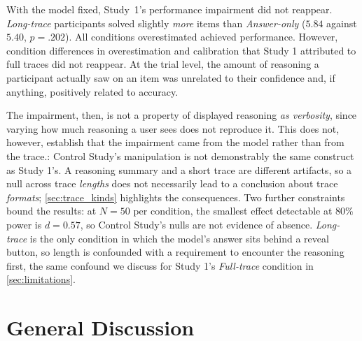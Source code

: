 \documentclass[manuscript,review,anonymous]{acmart}
\begin{document}
With the model fixed, Study~1's performance impairment did not reappear. \textit{Long-trace} participants solved slightly \emph{more} items than
\textit{Answer-only} ($5.84$ against $5.40$, $p = .202$). All conditions overestimated achieved performance. However, condition differences in overestimation and calibration that Study 1 attributed to full traces did not reappear. At the trial level, the amount of reasoning a participant actually saw on an item was unrelated to their confidence and, if anything, positively related to accuracy. 

The impairment, then, is not a property of displayed reasoning \emph{as verbosity}, since varying how much reasoning a user sees does not reproduce it. This does not, however, establish that the impairment came from the model rather than from the trace.: Control Study's manipulation is not demonstrably the same construct as Study 1's. A reasoning summary and a short trace are different artifacts, so a null across trace \emph{lengths} does not necessarily lead to a conclusion about trace \emph{formats}; \autoref{sec:trace_kinds} highlights the consequences.
Two further constraints bound the results: at $N = 50$ per condition, the smallest effect detectable at 80\% power is $d = 0.57$, so Control Study's nulls are not evidence of absence. \textit{Long-trace} is the only condition in which the model's answer sits behind a reveal button, so length is confounded with a requirement to encounter the reasoning first, the same confound we discuss for Study 1's \textit{Full-trace} condition in \autoref{sec:limitations}.

\section{General Discussion}
\end{document}
